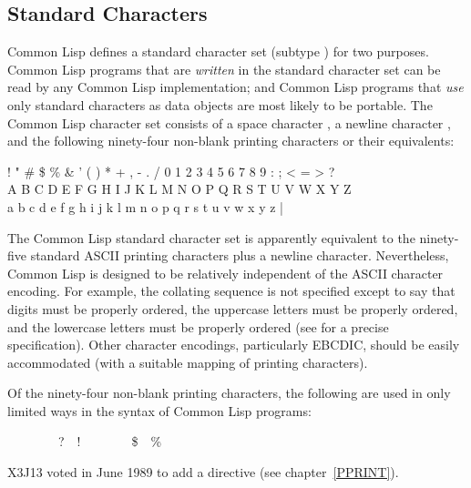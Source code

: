 \subsection{Standard Characters}

Common Lisp defines a standard character set (subtype )
for two purposes.
Common Lisp programs that are \emph{written} in the standard character set
can be read by any Common Lisp implementation; and Common Lisp programs
that \emph{use} only standard characters as data objects are most likely
to be portable.  The Common Lisp character set consists of a space character
, a newline character , and the
following ninety-four
non-blank printing characters or their equivalents:
\begin{lisp}
! " \# \$ \% \& ' ( ) * + , - . / 0 1 2 3 4 5 6 7 8 9 : ; < = > ? \\
{\Xatsign} A B C D E F G H I J K L M N O P Q R S T U V W X Y Z {\Xlbracket} {\Xbackslash} {\Xrbracket} {\Xcircumflex} {\Xunderscore} \\
{\Xbq} a b c d e f g h i j k l m n o p q r s t u v w x y z {\Xlbrace} | {\Xrbrace} {\Xtilde}
\end{lisp}
The Common Lisp standard character set is apparently equivalent to
the ninety-five standard ASCII printing characters plus a newline character.
Nevertheless, Common Lisp is designed to be relatively independent of
the ASCII character encoding.  For example, the collating sequence
is not specified except to say that digits must be properly ordered,
the uppercase letters must be properly ordered, and
the lowercase letters must be properly ordered
(see  for a precise specification).
Other character encodings, particularly EBCDIC, should be easily accommodated
(with a suitable mapping of printing characters).

Of the ninety-four non-blank printing characters, the following are
used in only limited ways in the syntax of Common Lisp programs:
\begin{lisp}
{\Xlbracket}~~{\Xrbracket}~~{\Xlbrace}~~{\Xrbrace}~~?~~!~~{\Xcircumflex}~~{\Xunderscore}~~{\Xtilde}~~\$~~\% 
\end{lisp}

\begin{newer}
X3J13 voted in June 1989 
to add a  directive \cd{{\Xtilde}{\Xunderscore}} (see chapter~\ref{PPRINT}).
\end{newer}

